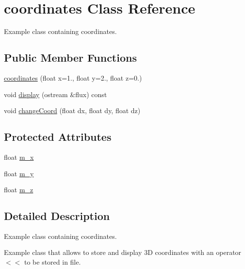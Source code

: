 \hypertarget{classcoordinates}{\section{coordinates \-Class \-Reference}
\label{classcoordinates}
}


\-Example class containing coordinates.  


\subsection*{\-Public \-Member \-Functions}
\begin{DoxyCompactItemize}
\item 
\hyperlink{classcoordinates_a98fbbc1fbf821b696912a4ecb701c66b}{coordinates} (float x=1., float y=2., float z=0.)
\item 
void \hyperlink{classcoordinates_a38d716641cacff0d6c95ce05ae61dc5a}{display} (ostream \&flux) const 
\item 
void \hyperlink{classcoordinates_ab65413a2f73a14a389a478c0b8bf18c2}{change\-Coord} (float dx, float dy, float dz)
\end{DoxyCompactItemize}
\subsection*{\-Protected \-Attributes}
\begin{DoxyCompactItemize}
\item 
float \hyperlink{classcoordinates_ac82c3ee413f677b1364613568f51e13d}{m\-\_\-x}
\item 
float \hyperlink{classcoordinates_adc9693154ff491b1b37b52b0fdfcc1fe}{m\-\_\-y}
\item 
float \hyperlink{classcoordinates_a4ccdaa5cee635bdc50d85617e1cb65e0}{m\-\_\-z}
\end{DoxyCompactItemize}


\subsection{\-Detailed \-Description}
\-Example class containing coordinates. 

\-Example class that allows to store and display 3\-D coordinates with an operator$<$$<$ to be stored in file. 


